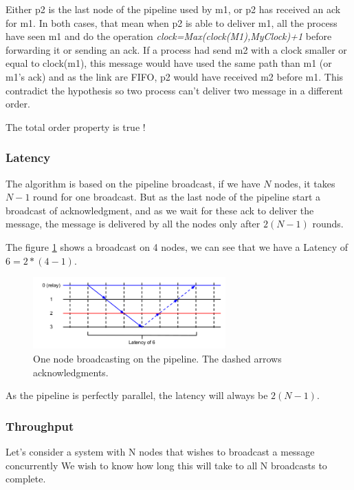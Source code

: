 \documentclass[a4paper]{article}
\begin{document}
\begin{itemize}
        Either p2 is the last node of the pipeline used by m1, or p2 has
        received an ack for m1. In both cases, that mean when p2 is able to
        deliver m1, all the process have seen m1 and do the operation 
        \textit{clock=Max(clock(M1),MyClock)+1} before forwarding it or 
        sending an ack. If a process had send
        m2 with a clock smaller or equal to clock(m1), this message would have
        used the same path than m1 (or m1's ack) and as the link are FIFO, p2
        would have received m2 before m1. This contradict the hypothesis so two
        process can't deliver two message in a different order.

        The total order property is true !

\end{itemize}
\label{sec:pipelineack-proof}


\subsubsection*{Latency}
The algorithm is based on the pipeline broadcast, if we have $N$ nodes, it takes
$N-1$ round for one broadcast. But as the last node of the pipeline start a
broadcast of acknowledgment, and as we wait for these ack to deliver the
message, the message is delivered by all the nodes only after $2(N-1)$ rounds.

The figure \ref{figure:latency2} shows a broadcast on 4 nodes, we can see that
we have a Latency of$6=2*(4-1)$.

\begin{figure}[h]
    \centering
    \includegraphics[width=280px]{Latency2.png}
    \caption{One node broadcasting on the pipeline. The dashed arrows
    acknowledgments.}
    \label{figure:latency2}
\end{figure}



As the pipeline is perfectly parallel, the latency will always be $2(N-1)$.
\subsubsection*{Throughput}
Let’s consider a system with N nodes that wishes to broadcast a message concurrently
We wish to know how long this will take to all N broadcasts to
complete.
\end{document}
